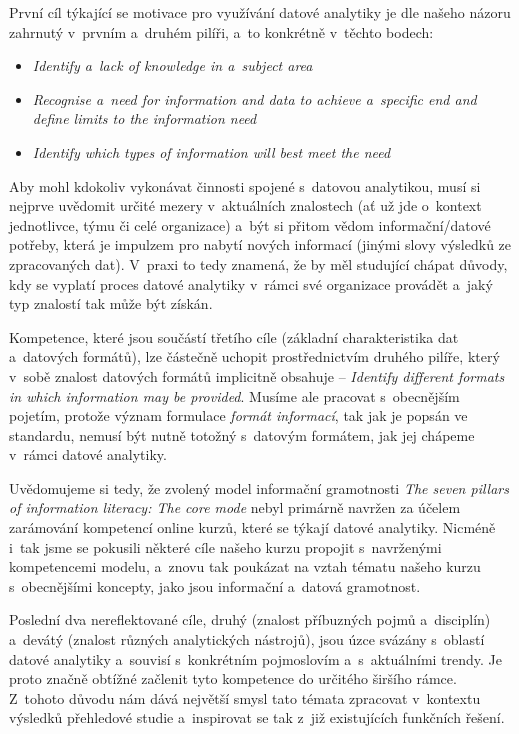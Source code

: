 První cíl týkající se motivace pro využívání datové analytiky je dle našeho názoru zahrnutý v~prvním a~druhém pilíři, a~to konkrétně v~těchto bodech:

\begin{itemize}
\tightlist
\item
  \emph{Identify a~lack of knowledge in a~subject area}
\item
  \emph{Recognise a~need for information and data to achieve a~specific end and define limits to the information need}
\item
  \emph{Identify which types of information will best meet the need}
\end{itemize}

Aby mohl kdokoliv vykonávat činnosti spojené s~datovou analytikou, musí si nejprve uvědomit určité mezery v~aktuálních znalostech (ať už jde o~kontext jednotlivce, týmu či celé organizace) a~být si přitom vědom informační/datové potřeby, která je impulzem pro nabytí nových informací (jinými slovy výsledků ze zpracovaných dat). V~praxi to tedy znamená, že by měl studující chápat důvody, kdy se vyplatí proces datové analytiky v~rámci své organizace provádět a~jaký typ znalostí tak může být získán.

Kompetence, které jsou součástí třetího cíle (základní charakteristika dat a~datových formátů), lze částečně uchopit prostřednictvím druhého pilíře, který v~sobě znalost datových formátů implicitně obsahuje -- \emph{Identify different formats in which information may be provided}. Musíme ale pracovat s~obecnějším pojetím, protože význam formulace \emph{formát informací}, tak jak je popsán ve standardu, nemusí být nutně totožný s~datovým formátem, jak jej chápeme v~rámci datové analytiky.

Uvědomujeme si tedy, že zvolený model informační gramotnosti \emph{The seven pillars of information literacy: The core mode} nebyl primárně navržen za účelem zarámování kompetencí online kurzů, které se týkají datové analytiky. Nicméně i~tak jsme se pokusili některé cíle našeho kurzu propojit s~navrženými kompetencemi modelu, a~znovu tak poukázat na vztah tématu našeho kurzu s~obecnějšími koncepty, jako jsou informační a~datová gramotnost.

Poslední dva nereflektované cíle, druhý (znalost příbuzných pojmů a~disciplín) a~devátý (znalost různých analytických nástrojů), jsou úzce svázány s~oblastí datové analytiky a~souvisí s~konkrétním pojmoslovím a~s~aktuálními trendy. Je proto značně obtížné začlenit tyto kompetence do určitého širšího rámce. Z~tohoto důvodu nám dává největší smysl tato témata zpracovat v~kontextu výsledků přehledové studie a~inspirovat se tak z~již existujících funkčních řešení.
